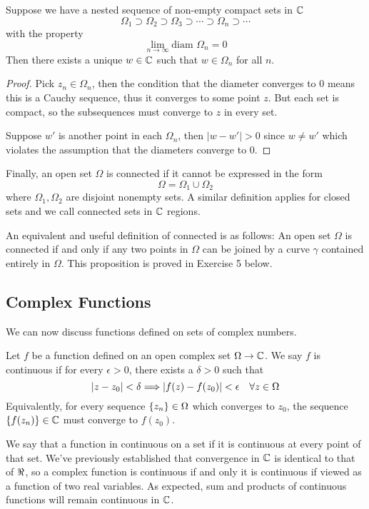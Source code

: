 \begin{proposition}
	Suppose we have a nested sequence of non-empty compact sets in $\mathbb{C}$
	\[ \Omega_1 \supset \Omega_2 \supset \Omega_3 \supset \cdots \supset \Omega_n \supset \cdots \]
	with the property
	\[ \lim_{n \to \infty} \text{diam } \Omega_n = 0 \]
	Then there exists a unique $w \in \mathbb{C}$ such that $w \in \Omega_n$ for all $n$.
\end{proposition}
\begin{proof}
	Pick $z_n \in \Omega_n$, then the condition that the diameter converges to 0 means this is a Cauchy sequence, thus it converges to some point $z$. But each set is compact, so the subsequences must converge to $z$ in every set. 
	
	Suppose $w'$ is another point in each $\Omega_n$, then $|w - w'| > 0$ since $w \neq w'$ which violates the assumption that the diameters converge to 0.
\end{proof}

Finally, an open set $\Omega$ is connected if it cannot be expressed in the form
\[ \Omega = \Omega_1 \cup \Omega_2 \]
where $\Omega_1, \Omega_2$ are disjoint nonempty sets. A similar definition applies for closed sets and we call connected sets in $\mathbb{C}$ regions.

An equivalent and useful definition of connected is as follows: An open set $\Omega$ is connected if and only if any two points in $\Omega$ can be joined by a curve $\gamma$ contained entirely in $\Omega$. This proposition is proved in Exercise 5 below.

\subsection{Complex Functions}
We can now discuss functions defined on sets of complex numbers.

\begin{definition}
	Let $f$ be a function defined on an open complex set $\Omega \to \mathbb{C}$. We say $f$ is continuous if for every $\epsilon > 0$, there exists a $\delta > 0$ such that 
	\[ |z - z_0| < \delta \Longrightarrow |f(z) - f(z_0)| < \epsilon \quad \forall z \in \Omega \]
	Equivalently, for every sequence $\left\{z_n\right\} \in \Omega$ which converges to $z_0$, the sequence $\left\{f(z_n)\right\} \in \mathbb{C}$ must converge to $f(z_0)$.
\end{definition}

We say that a function in continuous on a set if it is continuous at every point of that set. We've previously established that convergence in $\mathbb{C}$ is identical to that of $\real$, so a complex function is continuous if and only it is continuous if viewed as a function of two real variables. As expected, sum and products of continuous functions will remain continuous in $\mathbb{C}$.

